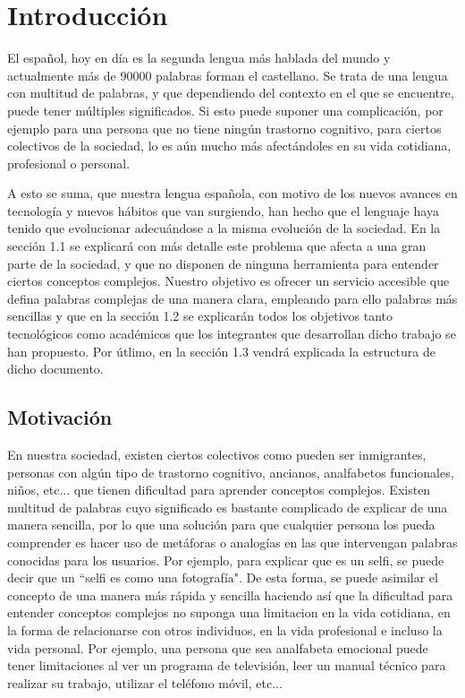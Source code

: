 \chapter{Introducción}
\label{cap:introduccion}


El español, hoy en día es la segunda lengua más hablada del mundo y actualmente más de 90000 palabras forman el castellano. 
Se trata de una lengua con multitud de palabras, y que dependiendo del contexto en el que se encuentre, puede tener múltiples significados.
Si esto puede suponer una complicación, por ejemplo para una persona que no tiene ningún trastorno cognitivo, para ciertos colectivos de la sociedad, lo es aún mucho más afectándoles en su vida cotidiana, profesional o personal. 

A esto se suma, que nuestra lengua española, con motivo de los nuevos avances en tecnología y nuevos hábitos que van surgiendo, han hecho que el lenguaje haya tenido que evolucionar adecuándose a la misma evolución de la sociedad.
En la sección 1.1 se explicará con más detalle este problema que afecta a una gran parte de la sociedad, y que no disponen de ninguna herramienta para entender ciertos conceptos complejos. 
Nuestro objetivo es ofrecer un servicio accesible que defina palabras complejas de una manera clara, empleando para ello palabras más sencillas y que en la sección 1.2 se explicarán todos los objetivos tanto tecnológicos como académicos que los integrantes que desarrollan dicho trabajo se han propuesto.
Por útlimo, en la sección 1.3 vendrá explicada la estructura de dicho documento.



	


\section{Motivación}
\label{cap:sec:motivacion}

En nuestra sociedad, existen ciertos colectivos como pueden ser inmigrantes, personas con algún tipo de trastorno cognitivo, ancianos, analfabetos funcionales, niños, etc... que tienen dificultad para aprender conceptos complejos. 
Existen multitud de palabras cuyo significado es bastante complicado de explicar de una manera sencilla, por lo que una solución para que cualquier persona los pueda comprender es hacer uso de metáforas o analogías en las que intervengan palabras conocidas para los usuarios. Por ejemplo, para explicar que es un selfi, se puede decir que un ``selfi es como una fotografía". De esta forma, se puede asimilar el concepto de una manera más rápida y sencilla haciendo así que la dificultad para entender conceptos complejos no suponga una limitacion en la vida cotidiana, en la forma de relacionarse con otros individuos, en la vida profesional e incluso la vida personal. 
Por ejemplo, una persona que sea analfabeta emocional puede tener limitaciones al ver un programa de televisión, leer un manual técnico para realizar su trabajo, utilizar el teléfono móvil, etc...

